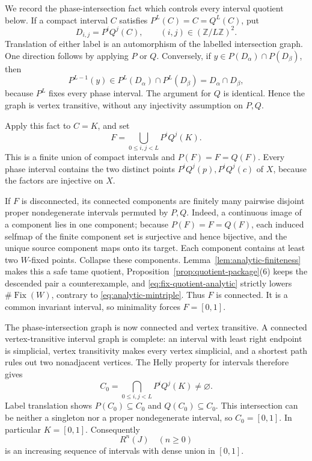 \documentclass[11pt]{article}
\theoremstyle{definition}
\theoremstyle{remark}
\newcommand{\I}{[0,1]}
\newcommand{\Fix}{\operatorname{Fix}}
\begin{document}
We record the phase-intersection fact which controls every interval quotient
below.  If a compact interval \(C\) satisfies \(P^L(C)=C=Q^L(C)\), put
\[
 D_{i,j}=P^iQ^j(C),\qquad (i,j)\in(\mathbb Z/L\mathbb Z)^2.
\]
Translation of either label is an automorphism of the labelled intersection
graph.  One direction follows by applying \(P\) or \(Q\).  Conversely, if
\(y\in P(D_\alpha)\cap P(D_\beta)\), then
\[
 P^{L-1}(y)\in P^L(D_\alpha)\cap P^L(D_\beta)
 =D_\alpha\cap D_\beta,
\]
because \(P^L\) fixes every phase interval.  The argument for \(Q\) is
identical.  Hence the graph is vertex transitive, without any injectivity
assumption on \(P,Q\).

Apply this fact to \(C=K\), and set
\[
 F=\bigcup_{0\leq i,j<L}P^iQ^j(K).
\]
This is a finite union of compact intervals and \(P(F)=F=Q(F)\).  Every phase
interval contains the two distinct points \(P^iQ^j(p),P^iQ^j(c)\) of
\(X\), because the factors are injective on \(X\).

If \(F\) is disconnected, its connected components are finitely many
pairwise disjoint proper nondegenerate intervals permuted by \(P,Q\).  Indeed,
a continuous image of a component lies in one component; because
\(P(F)=F=Q(F)\), each induced selfmap of the finite component set is
surjective and hence bijective, and the unique source component maps onto its
target.  Each component contains at least two \(W\)-fixed points.  Collapse
these components.
Lemma~\ref{lem:analytic-finiteness} makes this a safe tame quotient,
Proposition~\ref{prop:quotient-package}(6) keeps the descended pair a
counterexample, and
\eqref{eq:fix-quotient-analytic} strictly lowers \(\#\Fix(W)\), contrary to
\eqref{eq:analytic-mintriple}.  Thus \(F\) is connected.  It is a common
invariant interval, so minimality forces \(F=\I\).

The phase-intersection graph is now connected and vertex transitive.  A
connected vertex-transitive interval graph is complete: an interval with
least right endpoint is simplicial, vertex transitivity makes every vertex
simplicial, and a shortest path rules out two nonadjacent vertices.  The
Helly property for intervals therefore gives
\[
 C_0=\bigcap_{0\leq i,j<L}P^iQ^j(K)\neq\varnothing.
\]
Label translation shows \(P(C_0)\subseteq C_0\) and
\(Q(C_0)\subseteq C_0\).  This intersection can be neither a singleton nor
a proper nondegenerate interval, so \(C_0=\I\).  In particular \(K=\I\).
Consequently
\begin{equation}\label{eq:analytic-dense-diagonal}
 R^n(J)\quad(n\geq0)
\end{equation}
is an increasing sequence of intervals with dense union in \(\I\).
\end{document}
